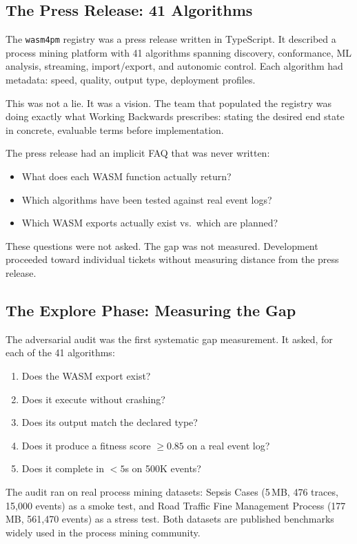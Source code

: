 \documentclass[11pt,a4paper]{article}
\newcommand{\code}[1]{\texttt{#1}}
\begin{document}
\subsection{The Press Release: 41 Algorithms}

The \code{wasm4pm} registry was a press release written in TypeScript.  It
described a process mining platform with 41 algorithms spanning discovery,
conformance, ML analysis, streaming, import/export, and autonomic control.
Each algorithm had metadata: speed, quality, output type, deployment profiles.

This was not a lie.  It was a vision.  The team that populated the registry
was doing exactly what Working Backwards prescribes: stating the desired end
state in concrete, evaluable terms before implementation.

The press release had an implicit FAQ that was never written:
\begin{itemize}
  \item What does each WASM function actually return?
  \item Which algorithms have been tested against real event logs?
  \item Which WASM exports actually exist vs.\ which are planned?
\end{itemize}

These questions were not asked.  The gap was not measured.  Development
proceeded toward individual tickets without measuring distance from the press
release.

\subsection{The Explore Phase: Measuring the Gap}

The adversarial audit was the first systematic gap measurement.  It asked, for
each of the 41 algorithms:

\begin{enumerate}
  \item Does the WASM export exist?
  \item Does it execute without crashing?
  \item Does its output match the declared type?
  \item Does it produce a fitness score $\geq 0.85$ on a real event log?
  \item Does it complete in $< 5$s on 500K events?
\end{enumerate}

The audit ran on real process mining datasets: Sepsis Cases (5\,MB, 476 traces, 15,000 events)
as a smoke test, and Road Traffic Fine Management Process (177\,MB, 561,470 events) as a stress
test.  Both datasets are published benchmarks widely used in the process mining community.
\end{document}
